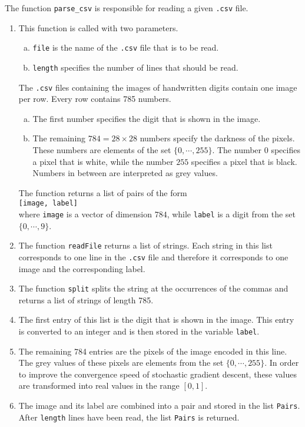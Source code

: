 The function \texttt{parse\_csv} is responsible for reading a given \texttt{.csv} file.
\begin{enumerate}
\item This function is called with two parameters.
      \begin{enumerate}[(a)]
      \item \texttt{file} is the name of the \texttt{.csv} file that is to be read.
      \item \texttt{length} specifies the number of lines that should be read.
      \end{enumerate}
      The \texttt{.csv} files containing the images of handwritten digits contain one image per row.
      Every row contains 785 numbers.
      \begin{enumerate}[(a)]
      \item The first number specifies the digit that is shown in the image.
      \item The remaining $784= 28 \times 28$ numbers specify the darkness of the pixels.
            These numbers are elements of the set $\{0,\cdots,255\}$.  The number $0$ specifies a pixel that is
            white, while the number $255$ specifies a pixel that is black.  Numbers in between are interpreted
            as grey values.
      \end{enumerate}
      The function returns a list of pairs of the form
      \\[0.2cm]
      \hspace*{1.3cm}
      \texttt{[image, label]}
      \\[0.2cm]
      where \texttt{image} is a vector of dimension $784$, while \texttt{label} is a digit from the set
      $\{0,\cdots,9\}$.
\item The function \texttt{readFile} returns a list of strings.  Each string in this list corresponds to
      one line in the \texttt{.csv} file and therefore it corresponds to one image and the corresponding label.
\item The function \texttt{split} splits the string at the occurrences of the commas and returns a list of
      strings of length 785.
\item The first entry of this list is the digit that is shown in the image.  This entry is converted to
      an integer and is then stored in the variable \texttt{label}.
\item The remaining 784 entries are the pixels of the image encoded in this line.  The grey values of these
      pixels are elements from the set $\{0,\cdots,255\}$.  In order to improve the convergence speed of stochastic
      gradient descent, these values are transformed into real values in the range $[0,1]$. 
\item The image and its label are combined into a pair and stored in the list \texttt{Pairs}.
      After \texttt{length} lines have been read, the list \texttt{Pairs} is returned.
\end{enumerate}
